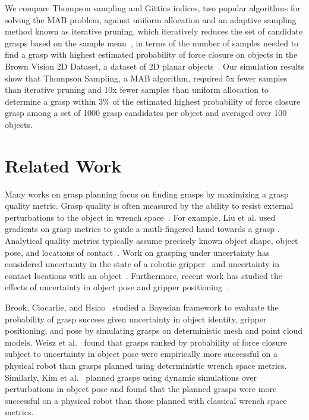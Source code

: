 \documentclass[10pt, conference]{ieeeconf}      %
\begin{document}
We compare Thompson sampling and Gittins indices, two popular algorithms for solving the MAB problem,
against uniform allocation and an adaptive sampling method known as iterative pruning, which iteratively reduces the set
of candidate grasps based on the sample mean~\cite{kehoe2012toward},
in terms of the number of samples needed to find a grasp with highest estimated probability of force closure on objects in the Brown Vision 2D Dataset, a dataset of 2D planar objects~\cite{brown, christopoulos2007handling}. Our simulation results show that Thompson Sampling, a MAB algorithm, required $5$x fewer samples than iterative
pruning and $10$x fewer samples than uniform allocation to determine a grasp within $3\%$ of the estimated highest probability of force closure
grasp among a set of 1000 grasp candidates per object and averaged over 100 objects.





\section{Related Work}

Many works on grasp planning focus on finding grasps by maximizing a grasp quality metric. Grasp quality is often measured by the ability to resist external perturbations to the object in wrench space~\cite{ferrari1992, miller2004graspit}. For example, Liu et al. used gradients on grasp metrics to guide a mutli-fingered hand towards a grasp \cite{liu2004quality}. Analytical quality metrics typically assume precisely known object shape, object pose, and locations of contact~\cite{cheong2011output, ciocarlie2009}. Work on grasping under uncertainty has considered uncertainty in the state of a robotic gripper~\cite{goldberg1990bayesian, stulp2011learning} and uncertainty in contact locations with an object~\cite{zheng2005}. Furthermore, recent work has studied the effects of uncertainty in object pose and gripper positioning~\cite{brook2011collaborative, hsiao2011bayesian}.

Brook, Ciocarlie, and Hsiao~\cite{brook2011collaborative, hsiao2011bayesian} studied a Bayesian framework to evaluate the probability of grasp success given uncertainty in object identity, gripper positioning, and pose by simulating grasps on deterministic mesh and point cloud models.
Weisz et al.~\cite{weisz2012pose} found that grasps ranked by probability of force closure subject to uncertainty in object pose were empirically more successful on a physical robot than grasps planned using deterministic wrench space metrics. 
Similarly, Kim et al.~\cite{kim2012physically} planned grasps using dynamic simulations over perturbations in object pose and found that the planned grasps were more successful on a physical robot than those planned with classical wrench space metrics.
\end{document}
